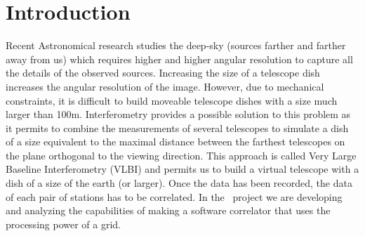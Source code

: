 \section{Introduction}

Recent Astronomical research studies the deep-sky (sources farther and
farther away from us) which requires higher and higher angular
resolution to capture all the details of the observed sources.
Increasing the size of a telescope dish increases the angular
resolution of the image.  However, due to mechanical constraints, it
is difficult to build moveable telescope dishes with a size much
larger than 100m. Interferometry provides a possible solution to this
problem as it permits to combine the measurements of several
telescopes to simulate a dish of a size equivalent to the maximal
distance between the farthest telescopes on the plane orthogonal to
the viewing direction.  This approach is called Very Large Baseline
Interferometry (VLBI) and permits us to build a virtual telescope with
a dish of a size of the earth (or larger). Once the data has been
recorded, the data of each pair of stations has to be correlated.  In
the \scarie\ project we are developing and analyzing the capabilities
of making a software correlator that uses the processing power of a
grid.

